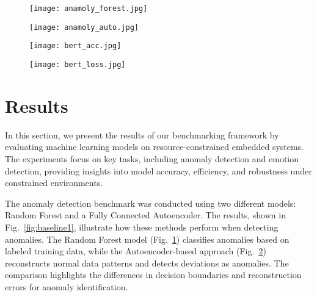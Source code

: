 \documentclass[conference]{IEEEtran}
\begin{document}
\begin{figure*}[!htbp]
\centering
\captionsetup[subfigure]{justification=centering}
\captionsetup{justification=centering}

  \begin{subfigure}{0.48\linewidth}
  \centering
    \texttt{[image: anamoly\_forest.jpg]}
    \caption{}
    \label{plots:1-a}
  \end{subfigure}
  \hfill
  \begin{subfigure}{0.48\linewidth}
  \centering
    \texttt{[image: anamoly\_auto.jpg]}
    \caption{}
    \label{plots:1-b}
  \end{subfigure}

  \caption{Results of anomaly detection using two methods.}
  \label{fig:baseline1}
\end{figure*}

\begin{figure*}[!htbp]
\centering
\captionsetup[subfigure]{justification=centering}
\captionsetup{justification=centering}

  \begin{subfigure}{0.48\linewidth}
  \centering
    \texttt{[image: bert\_acc.jpg]}
    \caption{}
    \label{plots:2-a}
  \end{subfigure}
  \hfill
  \begin{subfigure}{0.48\linewidth}
  \centering
    \texttt{[image: bert\_loss.jpg]}
    \caption{}
    \label{plots:2-b}
  \end{subfigure}

  \caption{Training loss and accuracy of BERT model for emotion detection benchmark.}
  \label{fig:baseline2}
\end{figure*}

\section{Results}

In this section, we present the results of our benchmarking framework by evaluating machine learning models on resource-constrained embedded systems. The experiments focus on key tasks, including anomaly detection and emotion detection, providing insights into model accuracy, efficiency, and robustness under constrained environments.

The anomaly detection benchmark was conducted using two different models: Random Forest and a Fully Connected Autoencoder. The results, shown in Fig.~\ref{fig:baseline1}, illustrate how these methods perform when detecting anomalies. The Random Forest model (Fig.~\ref{plots:1-a}) classifies anomalies based on labeled training data, while the Autoencoder-based approach (Fig.~\ref{plots:1-b}) reconstructs normal data patterns and detects deviations as anomalies. The comparison highlights the differences in decision boundaries and reconstruction errors for anomaly identification.
\end{document}
